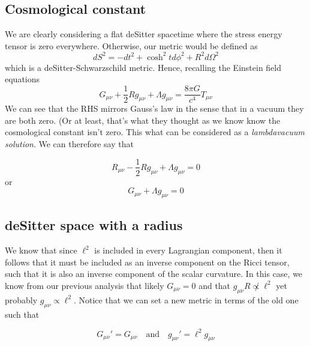 \documentclass{article}
\begin{document}
		\subsection{Cosmological constant}
			We are clearly considering a flat deSitter spacetime where the stress energy tensor is zero everywhere. Otherwise, our metric would be defined as
			$$ dS^2 = -dt^2 + \cosh^2 t d\phi^2 + R^2d\Omega^2$$
			which is a deSitter-Schwarzschild metric.
			Hence, recalling the Einstein field equations
			$$ G_{\mu\nu} + \frac{1}{2} R g_{\mu\nu} + \Lambda g_{\mu\nu} = \frac{8\pi G}{c^4} T_{\mu\nu}$$
			We can see that the RHS mirrors Gauss's law in the sense that in a vacuum they are both zero. (Or at least, that's what they thought as we know know the cosmological constant isn't zero. This what can be considered as a \textit{lambdavacuum solution}. We can therefore say that
			
			$$ R_{\mu\nu} -\frac{1}{2}R g_{\mu\nu} + \Lambda g_{\mu\nu} = 0$$
			or
			$$ G_{\mu\nu} +\Lambda g_{\mu\nu} = 0 $$
		\subsection{deSitter space with a radius}
			We know that since $\ell^2$ is included in every Lagrangian component, then it follows that
			it must be included as an inverse component on the Ricci tensor, such that it is also an inverse component of the scalar curvature. In this case, we know from our previous analysis that likely $G_{\mu\nu}=0$ and that $g_{\mu\nu} R \not\propto \ell^2$ yet probably $g_{\mu\nu} \propto \ell^2$. Notice that we can set a new metric in terms of the old one such that
			
			$$ G_{\mu\nu}' = G_{\mu\nu} \quad \text{and} \quad g_{\mu\nu}' = \ell^2 g_{\mu\nu}$$
\end{document}
